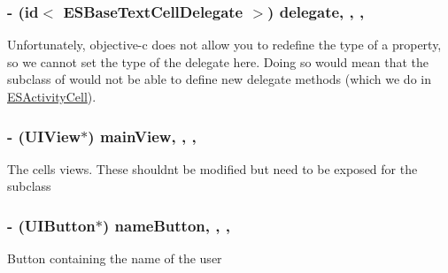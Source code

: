 \subsubsection[{delegate}]{\setlength{\rightskip}{0pt plus 5cm}-\/ (id$<$ {\bf E\+S\+Base\+Text\+Cell\+Delegate} $>$) delegate\hspace{0.3cm}{\ttfamily [read]}, {\ttfamily [write]}, {\ttfamily [nonatomic]}, {\ttfamily [strong]}}\label{interface_e_s_base_text_cell_a199ecd22aed8dbb7c3e1425e3ebf0df8}
Unfortunately, objective-\/c does not allow you to redefine the type of a property, so we cannot set the type of the delegate here. Doing so would mean that the subclass of would not be able to define new delegate methods (which we do in \hyperlink{interface_e_s_activity_cell}{E\+S\+Activity\+Cell}). \hypertarget{interface_e_s_base_text_cell_ac553762888205865a2b83ddf9e285d2b}{}
\subsubsection[{main\+View}]{\setlength{\rightskip}{0pt plus 5cm}-\/ (U\+I\+View$\ast$) main\+View\hspace{0.3cm}{\ttfamily [read]}, {\ttfamily [write]}, {\ttfamily [nonatomic]}, {\ttfamily [strong]}}\label{interface_e_s_base_text_cell_ac553762888205865a2b83ddf9e285d2b}
The cell\textquotesingle{}s views. These shouldn\textquotesingle{}t be modified but need to be exposed for the subclass \hypertarget{interface_e_s_base_text_cell_ac348ef1f190886455518d36cc3828e13}{}
\subsubsection[{name\+Button}]{\setlength{\rightskip}{0pt plus 5cm}-\/ (U\+I\+Button$\ast$) name\+Button\hspace{0.3cm}{\ttfamily [read]}, {\ttfamily [write]}, {\ttfamily [nonatomic]}, {\ttfamily [strong]}}\label{interface_e_s_base_text_cell_ac348ef1f190886455518d36cc3828e13}
Button containing the name of the user \hypertarget{interface_e_s_base_text_cell_a9ce7dfc74d6bba195bd1036f98e5375b}{}
